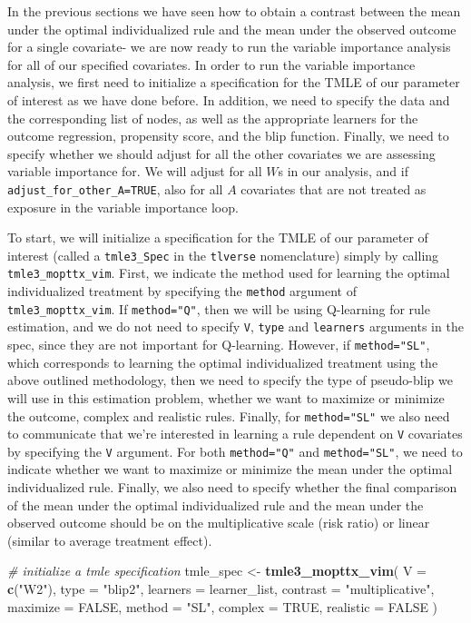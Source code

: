 \documentclass[12pt, krantz2,]{krantz}
\newenvironment{Shaded}{\begin{snugshade}}{\end{snugshade}}
\newcommand{\CommentTok}[1]{\textcolor[rgb]{0.37,0.37,0.37}{\textit{#1}}}
\newcommand{\DataTypeTok}[1]{\textcolor[rgb]{0.27,0.27,0.27}{#1}}
\newcommand{\KeywordTok}[1]{\textcolor[rgb]{0.27,0.27,0.27}{\textbf{#1}}}
\newcommand{\NormalTok}[1]{#1}
\newcommand{\OtherTok}[1]{\textcolor[rgb]{0.37,0.37,0.37}{#1}}
\newcommand{\StringTok}[1]{\textcolor[rgb]{0.5,0.5,0.5}{#1}}
\theoremstyle{definition}
\theoremstyle{definition}
\theoremstyle{definition}
\newcommand{\1}{\mathbbm{1}}
\begin{document}
In the previous sections we have seen how to obtain a contrast between the mean
under the optimal individualized rule and the mean under the observed outcome
for a single covariate- we are now ready to run the variable importance analysis
for all of our specified covariates. In order to run the variable importance
analysis, we first need to initialize a specification for the TMLE of our
parameter of interest as we have done before. In addition, we need to specify
the data and the corresponding list of nodes, as well as the appropriate
learners for the outcome regression, propensity score, and the blip function.
Finally, we need to specify whether we should adjust for all the other
covariates we are assessing variable importance for. We will adjust for all \(W\)s
in our analysis, and if \texttt{adjust\_for\_other\_A=TRUE}, also for all \(A\) covariates
that are not treated as exposure in the variable importance loop.

To start, we will initialize a specification for the TMLE of our parameter of
interest (called a \texttt{tmle3\_Spec} in the \texttt{tlverse} nomenclature) simply by calling
\texttt{tmle3\_mopttx\_vim}. First, we indicate the method used for learning the optimal
individualized treatment by specifying the \texttt{method} argument of
\texttt{tmle3\_mopttx\_vim}. If \texttt{method="Q"}, then we will be using Q-learning for rule
estimation, and we do not need to specify \texttt{V}, \texttt{type} and \texttt{learners} arguments
in the spec, since they are not important for Q-learning. However, if
\texttt{method="SL"}, which corresponds to learning the optimal individualized
treatment using the above outlined methodology, then we need to specify the type
of pseudo-blip we will use in this estimation problem, whether we want to
maximize or minimize the outcome, complex and realistic rules. Finally, for
\texttt{method="SL"} we also need to communicate that we're interested in learning a
rule dependent on \texttt{V} covariates by specifying the \texttt{V} argument. For both
\texttt{method="Q"} and \texttt{method="SL"}, we need to indicate whether we want to maximize
or minimize the mean under the optimal individualized rule. Finally, we also
need to specify whether the final comparison of the mean under the optimal
individualized rule and the mean under the observed outcome should be on the
multiplicative scale (risk ratio) or linear (similar to average treatment
effect).

\begin{Shaded}
\begin{Highlighting}[]
\CommentTok{# initialize a tmle specification}
\NormalTok{tmle_spec <-}\StringTok{ }\KeywordTok{tmle3_mopttx_vim}\NormalTok{(}
  \DataTypeTok{V =} \KeywordTok{c}\NormalTok{(}\StringTok{"W2"}\NormalTok{),}
  \DataTypeTok{type =} \StringTok{"blip2"}\NormalTok{,}
  \DataTypeTok{learners =}\NormalTok{ learner_list,}
  \DataTypeTok{contrast =} \StringTok{"multiplicative"}\NormalTok{,}
  \DataTypeTok{maximize =} \OtherTok{FALSE}\NormalTok{,}
  \DataTypeTok{method =} \StringTok{"SL"}\NormalTok{,}
  \DataTypeTok{complex =} \OtherTok{TRUE}\NormalTok{,}
  \DataTypeTok{realistic =} \OtherTok{FALSE}
\NormalTok{)}
\end{Highlighting}
\end{Shaded}
\end{document}
